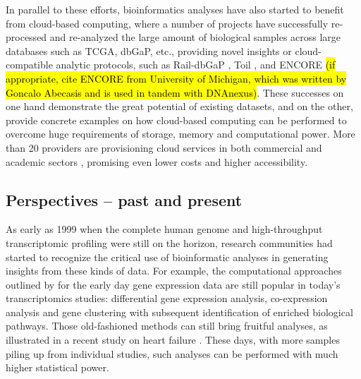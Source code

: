 \documentclass[letter]{bioinfo}
\begin{document}
	In parallel to these efforts, bioinformatics analyses have also started to benefit from cloud-based computing, where a number of projects have successfully re-processed and re-analyzed the large amount of biological samples across large databases such as TCGA, dbGaP, etc., providing novel insights or cloud-compatible analytic protocols, such as Rail-dbGaP \citep{Nellore:2016:RaildbGaP}, Toil \citep{Vivian:2017:Toil}, and ENCORE \hl{(if appropriate, cite ENCORE from University of Michigan, which was written by Goncalo Abecasis and is used in tandem with DNAnexus)}. These successes on one hand demonstrate the great potential of existing datasets, and on the other, provide concrete examples on how cloud-based computing can be performed to overcome huge requirements of storage, memory and computational power. More than 20 providers are provisioning cloud services in both commercial and academic sectors \citep{Langmead:2018:Cloud}, promising even lower costs and higher accessibility.
	
	
	
	\subsection*{Perspectives -- past and present}
	
	As early as 1999 when the complete human genome and high-throughput transcriptomic profiling were still on the horizon, research communities had started to recognize the critical use of bioinformatic analyses in generating insights from these kinds of data. For example, the computational approaches outlined by \cite{Claverie:1999:Computational} for the early day gene expression data are still popular in today's transcriptomics studies: differential gene expression analysis, co-expression analysis and gene clustering with subsequent identification of enriched biological pathways. Those old-fashioned methods can still bring fruitful analyses, as illustrated in a recent study on heart failure \citep{Santolini:2018:personalized}. These days, with more samples piling up from individual studies, such analyses can be performed with much higher statistical power.
	
\end{document}
